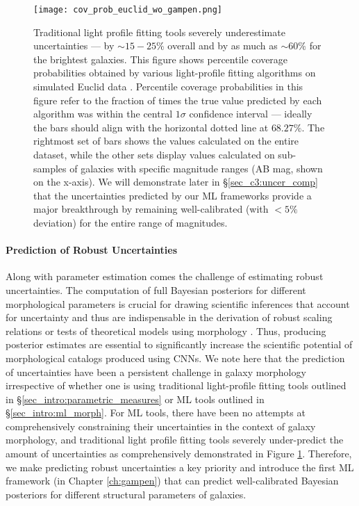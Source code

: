 \begin{figure}[htbp]
    \centering
    \texttt{[image: cov\_prob\_euclid\_wo\_gampen.png]}
    \caption{Traditional light profile fitting tools severely underestimate uncertainties --- by $\sim15-25\%$ overall and by as much as $\sim60\%$ for the brightest galaxies. This figure shows percentile coverage probabilities obtained by various light-profile fitting algorithms on simulated Euclid data \citep[][]{euclid_morph}. Percentile coverage probabilities in this figure refer to the fraction of times the true value predicted by each algorithm was within the central $1\sigma$ confidence interval --- ideally the bars should align with the horizontal dotted line at $68.27\%$. The rightmost set of bars shows the values calculated on the entire dataset, while the other sets display values calculated on sub-samples of galaxies with specific magnitude ranges (AB mag, shown on the x-axis). We will demonstrate later in \S \ref{sec_c3:uncer_comp} that the uncertainties predicted by our ML frameworks provide a major breakthrough by remaining well-calibrated (with $<5\%$ deviation) for the entire range of magnitudes.}
    \label{fig_intro:uncertainties}
\end{figure}

\paragraph{Prediction of Robust Uncertainties} Along with parameter estimation comes the challenge of estimating robust uncertainties. The computation of full Bayesian posteriors for different morphological parameters is crucial for drawing scientific inferences that account for uncertainty and thus are indispensable in the derivation of robust scaling relations  \citep[e.g.,][]{Bernardi2013TheProfile, vanderWel20143D-HST+CANDELS:3} or tests of theoretical models using morphology \citep[e.g.,][]{Schawinski2014TheGalaxies}. Thus, producing posterior estimates are essential to significantly increase the scientific potential of morphological catalogs produced using CNNs. We note here that the prediction of uncertainties have been a persistent challenge in galaxy morphology irrespective of whether one is using traditional light-profile fitting tools outlined in \S \ref{sec_intro:parametric_measures} or ML tools outlined in \S \ref{sec_intro:ml_morph}. For ML tools, there have been no attempts at comprehensively constraining their uncertainties in the context of galaxy morphology, and traditional light profile fitting tools severely under-predict the amount of uncertainties as comprehensively demonstrated in Figure \ref{fig_intro:uncertainties}. Therefore, we make predicting robust uncertainties a key priority and introduce the first ML framework (in Chapter \ref{ch:gampen}) that can predict well-calibrated Bayesian posteriors for different structural parameters of galaxies. 

